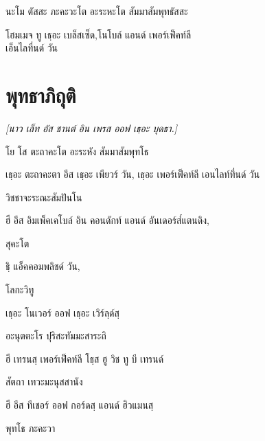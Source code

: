 นะโม ตัสสะ ภะคะวะโต อะระหะโต สัมมาสัมพุทธัสสะ 

\begin{english}
โฮมเมจ ทู เธฺอะ เบล็สเซ็ด,โนโบล์ แอนด์ เพอร์เฟ็คท์ลี\\
\vin เอ็นไลทึ่นด์ วัน
\end{english}

\chapter{พุทธาภิถุติ}

\begin{leader}
\end{leader}

\begin{leader}
\textit{[นาว เล็ท อัส ชานต์ อิน เพรส ออฟ เธฺอะ บุดธา.]}
\end{leader}

โย โส ตะถาคะโต อะระหัง สัมมาสัมพุทโธ

\begin{english}
เธฺอะ ตะถาคะตา อีส เธฺอะ เพียวร์ วัน, เธฺอะ เพอร์เฟ็คท์ลี เอนไลท์ทึ่นด์ วัน
\end{english}

วิชชาจะระณะสัมปันโน

\begin{english}
ฮี อีส อิมเพ็คเคโบล์ อิน คอนดักท์ แอนด์ อันเดอร์ส๎แตนดิง,
\end{english}

สุคะโต

\begin{english}
ธิฺ แอ็คคอมพลิชด์ วัน,
\end{english}

โลกะวิทู

\begin{english}
เธฺอะ โนเวอร์ ออฟ เธฺอะ เวิร์ลฺด์สฺ
\end{english}

อะนุตตะโร ปุริสะทัมมะสาระถิ

\begin{english}
ฮี เทรนสฺ เพอร์เฟ็คท์ลี โธฺส ฮู วิช ทู บี เทรนด์
\end{english}

สัตถา เทวะมะนุสสานัง

\begin{english}
ฮี อีส ทีเชอร์ ออฟ กอร์ดสฺ แอนด์ ฮิวแมนสฺ
\end{english}

พุทโธ ภะคะวา

